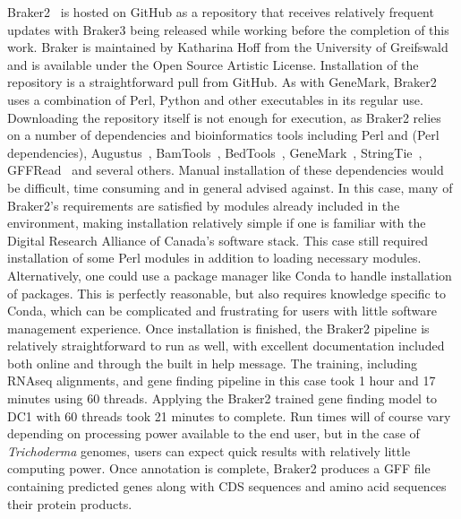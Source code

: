 
Braker2~\cite{bruna2021a} is hosted on GitHub as a repository that
receives relatively frequent updates with Braker3 being released while
working before the completion of this work. Braker is maintained by
Katharina Hoff from the University of Greifswald and is available
under the Open Source Artistic License. Installation of the repository
is a straightforward pull from GitHub. As with GeneMark, Braker2 uses
a combination of Perl, Python and other executables in its regular
use. Downloading the repository itself is not enough for execution, as
Braker2 relies on a number of dependencies and bioinformatics tools
including Perl and (Perl dependencies), Augustus~\cite{stanke2006a},
BamTools~\cite{barnett2011a},
BedTools~\cite{quinlan2010},
GeneMark~\cite{borodovsky2011a}, StringTie~\cite{pertea2015a},
GFFRead~\cite{pertea2020a} and several others. Manual installation of
these dependencies would be difficult, time consuming and in general
advised against. In this case, many of Braker2's requirements are
satisfied by modules already included in the environment, making
installation relatively simple if one is familiar with the Digital
Research Alliance of Canada's software stack. This case still required
installation of some Perl modules in addition to loading necessary
modules. Alternatively, one could use a package manager like Conda to
handle installation of packages. This is perfectly reasonable, but
also requires knowledge specific to Conda, which can be complicated
and frustrating for users with little software management
experience. Once installation is finished, the Braker2 pipeline is
relatively straightforward to run as well, with excellent
documentation included both online and through the built in help
message. The training, including RNAseq alignments, and gene finding
pipeline in this case took 1 hour and 17 minutes using 60
threads. Applying the Braker2 trained gene finding model to DC1 with
60 threads took 21 minutes to complete. Run times will of course vary
depending on processing power available to the end user, but in the
case of \textit{Trichoderma} genomes, users can expect quick results
with relatively little computing power. Once annotation is complete,
Braker2 produces a GFF file containing predicted genes along with CDS
sequences and amino acid sequences their protein products.


